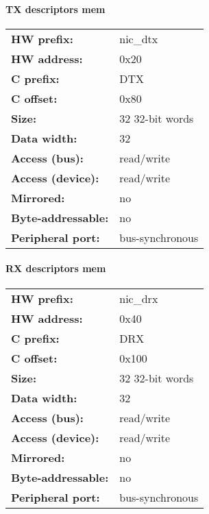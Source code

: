\paragraph*{TX descriptors mem}\vspace{12pt}

\begin{small}
\begin{tabular}{l l }
{\bf HW prefix:}  & nic\_dtx\\
{\bf HW address:}  & 0x20\\
{\bf C prefix:}  & DTX\\
{\bf C offset:}  & 0x80\\
{\bf Size:}  & 32 32-bit words\\
{\bf Data width:}  & 32\\
{\bf Access (bus):}  & read/write\\
{\bf Access (device):}  & read/write\\
{\bf Mirrored:}  & no\\
{\bf Byte-addressable:}  & no\\
{\bf Peripheral port:}  & bus-synchronous\\
\end{tabular}

\end{small}
\paragraph*{RX descriptors mem}\vspace{12pt}

\begin{small}
\begin{tabular}{l l }
{\bf HW prefix:}  & nic\_drx\\
{\bf HW address:}  & 0x40\\
{\bf C prefix:}  & DRX\\
{\bf C offset:}  & 0x100\\
{\bf Size:}  & 32 32-bit words\\
{\bf Data width:}  & 32\\
{\bf Access (bus):}  & read/write\\
{\bf Access (device):}  & read/write\\
{\bf Mirrored:}  & no\\
{\bf Byte-addressable:}  & no\\
{\bf Peripheral port:}  & bus-synchronous\\
\end{tabular}

\end{small}

